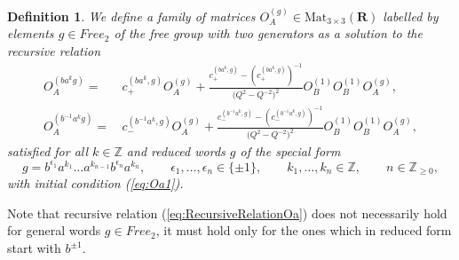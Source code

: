 \documentclass{amsart}
\newtheorem{definition}[theorem]{Definition}
\begin{document}
\begin{definition}
We define a family of matrices $O_A^{(g)}\in\mathrm{Mat}_{3\times 3}(\mathbf R)$ labelled by elements $g\in Free_2$ of the free group with two generators as a solution to the recursive relation
\begin{subequations}
\begin{align}
O_A^{(ba^k g)} =&\, c_+^{(ba^k,g)} O_A^{(g)} + \frac{c_+^{(ba^k,g)} - \left(c_+^{(ba^k,g)}\right)^{-1}}{\big(Q^2-Q^{-2}\big)^2} O_B^{(1)}O_B^{(1)} O_A^{(g)},
\label{eq:RecursiveRelationOab}\\
O_A^{(b^{-1} a^k g)} =&\, c_-^{(b^{-1}a^k,g)} O_A^{(g)} + \frac{c_-^{(b^{-1}a^k,g)} - \left(c_-^{(b^{-1}a^k,g)}\right)^{-1}}{\big(Q^2-Q^{-2}\big)^2} O_B^{(1)}O_B^{(1)} O_A^{(g)},
\label{eq:RecursiveRelationOabInverse}
\end{align}
\label{eq:RecursiveRelationOa}
\end{subequations}
satisfied for all $k\in\mathbb Z$ and reduced words $g$ of the special form
\begin{equation}
g=b^{\epsilon_1}a^{k_1}\dots a^{k_{n-1}}b^{\epsilon_n}a^{k_n},\qquad \epsilon_1,\dots,\epsilon_n\in\{\pm1\},\qquad k_1,\dots,k_n\in\mathbb Z,\qquad n\in\mathbb Z_{\geq0},
\label{eq:BReducedWordFree2}
\end{equation}
with initial condition (\ref{eq:Oa1}).

\label{def:Oag}
\end{definition}
Note that recursive relation (\ref{eq:RecursiveRelationOa}) does not necessarily hold for general words $g\in Free_2$, it must hold only for the ones which in reduced form start with $b^{\pm1}$.
\end{document}
